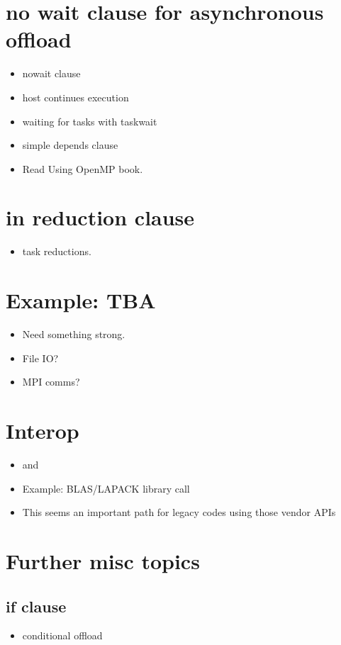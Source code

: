 \section{no wait clause for asynchronous offload}
\begin{itemize}
  \item nowait clause
  \item host continues execution
  \item waiting for tasks with taskwait
  \item simple depends clause
  \item Read Using OpenMP book.
\end{itemize}

\section{in reduction clause}
\label{sec:in_reduction}
\begin{itemize}
  \item task reductions.
\end{itemize}


\section{Example: TBA}
\begin{itemize}
  \item Need something strong.
  \item File IO?
  \item MPI comms?
\end{itemize}



\section{Interop}
\label{sec:interop}
\begin{itemize}
  \item {} and 
  \item Example: BLAS/LAPACK library call
  \item This seems an important path for legacy codes using those vendor APIs
\end{itemize}

\section{Further misc topics}
\subsection{if clause}
\label{sec:if_clause}
\begin{itemize}
  \item conditional offload
\end{itemize}

